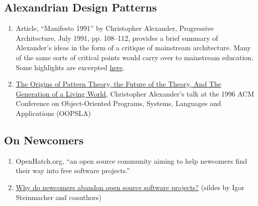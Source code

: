 \subsection{Alexandrian Design Patterns}

\begin{enumerate}
\item
  Article, ``Manifesto 1991'' by Christopher Alexander, Progressive
  Architecture, July 1991, pp. 108--112, provides a brief summary of
  Alexander's ideas in the form of a critique of mainstream
  architecture. Many of the same sorts of critical points would carry
  over to mainstream education. Some highlights are excerpted
  \href{https://plus.google.com/u/0/108598104736826154120/posts/agWYcqPhqSN}{here}.

\item \href{http://www.patternlanguage.com/archive/ieee/ieeetext.htm}{The
  Origins of Pattern Theory, the Future of the Theory, And The
  Generation of a Living World}, Christopher Alexander's talk at the
  1996 ACM Conference on Object-Oriented Programs, Systems, Languages
  and Applications (OOPSLA)
\end{enumerate}


\subsection{On Newcomers}

\begin{enumerate}
\item
  OpenHatch.org, ``an open source community aiming to help newcomers
  find their way into free software projects.''
\item
  \href{http://lapessc.ime.usp.br/public/papers/13872/CHASE13\_present.pdf}{Why
  do newcomers abandon open source software projects?} (sildes by Igor
  Steinmacher and coauthors)
\end{enumerate}
